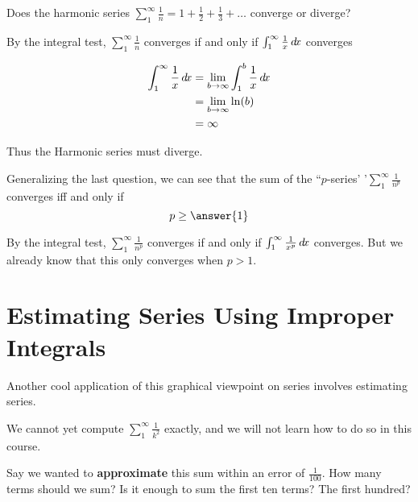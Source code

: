 \documentclass{ximera}
\begin{document}
\begin{question}
	Does the harmonic series $\sum_1^\infty \frac{1}{n} = 1 + \frac{1}{2} + \frac{1}{3}+ \dots$ converge or diverge?
	
	\begin{multipleChoice}
	\end{multipleChoice}
	
	\begin{hint}
		By the integral test, $\sum_1^\infty \frac{1}{n}$ converges if and only if $\int_1^\infty \frac{1}{x} \mathop{}\!d\! x$ converges 
	\end{hint}
	
	\begin{hint}
		\begin{align*}
			\int_1^\infty \frac{1}{x} \mathop{}\!d\! x &= \lim_{b \to \infty} \int_1^b \frac{1}{x} \mathop{}\!d\! x\\
				&=\lim_{b \to \infty} \ln(b) \\
				&=\infty
		\end{align*}
		
		Thus the Harmonic series must diverge.
	\end{hint}
\end{question}

\begin{question}
Generalizing the last question, we can see that the sum of the ``$p$-series' '$\sum_1^\infty \frac{1}{n^p}$ converges iff and only if
\[
p \geq \answer{1}
\]

	\begin{hint}
		By the integral test, $\sum_1^\infty \frac{1}{n^p}$ converges if and only if $\int_1^\infty \frac{1}{x^p} \mathop{}\!d\! x$ converges.  But we already know that this only converges when $p>1$.
	\end{hint}
\end{question}


\section{Estimating Series Using Improper Integrals}

Another cool application of this graphical viewpoint on series involves estimating series.

We cannot yet compute $\sum_1^\infty \frac{1}{k^2}$ exactly, and we will not learn how to do so in this course.

Say we wanted to \textbf{approximate} this sum within an error of $\frac{1}{100}$.  How many terms should we sum?  Is it enough to sum the first ten terms?  The first hundred?
\end{document}
